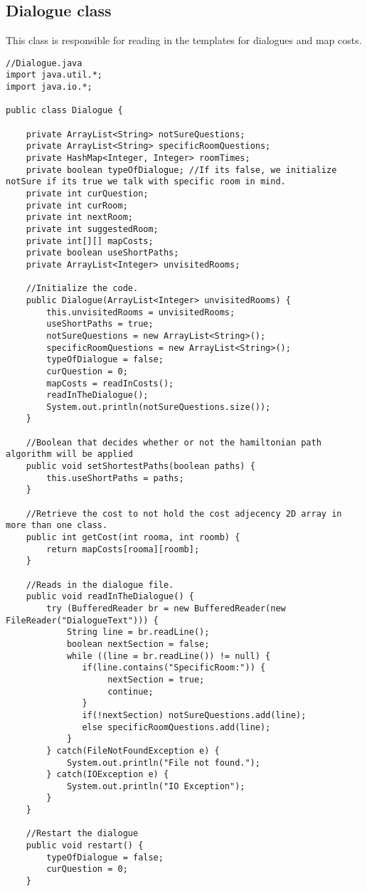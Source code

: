 \subsection{Dialogue class}
This class is responsible for reading in the templates for dialogues and map costs.
\begin{lstlisting}
//Dialogue.java
import java.util.*;
import java.io.*;

public class Dialogue {
	
	private ArrayList<String> notSureQuestions;
	private ArrayList<String> specificRoomQuestions;
	private HashMap<Integer, Integer> roomTimes;
	private boolean typeOfDialogue; //If its false, we initialize notSure if its true we talk with specific room in mind.
	private int curQuestion;
	private int curRoom;
	private int nextRoom;
	private int suggestedRoom;
	private int[][] mapCosts;
	private boolean useShortPaths;
	private ArrayList<Integer> unvisitedRooms;

	//Initialize the code.
	public Dialogue(ArrayList<Integer> unvisitedRooms) {
		this.unvisitedRooms = unvisitedRooms;
		useShortPaths = true;
		notSureQuestions = new ArrayList<String>();
		specificRoomQuestions = new ArrayList<String>();
		typeOfDialogue = false;
		curQuestion = 0;
		mapCosts = readInCosts();
		readInTheDialogue();
		System.out.println(notSureQuestions.size());
	}

	//Boolean that decides whether or not the hamiltonian path algorithm will be applied
	public void setShortestPaths(boolean paths) {
		this.useShortPaths = paths;
	}

	//Retrieve the cost to not hold the cost adjecency 2D array in more than one class.
	public int getCost(int rooma, int roomb) {
		return mapCosts[rooma][roomb];
	}

	//Reads in the dialogue file.
	public void readInTheDialogue() {
		try (BufferedReader br = new BufferedReader(new FileReader("DialogueText"))) {
		    String line = br.readLine();
		    boolean nextSection = false;
		    while ((line = br.readLine()) != null) {
		       if(line.contains("SpecificRoom:")) {
		       		nextSection = true;
		       		continue;
		       }
		       if(!nextSection) notSureQuestions.add(line);
		       else specificRoomQuestions.add(line);
		    }
		} catch(FileNotFoundException e) {
			System.out.println("File not found.");
		} catch(IOException e) {
			System.out.println("IO Exception");
		}
	}

	//Restart the dialogue
	public void restart() {
		typeOfDialogue = false;
		curQuestion = 0;
	}


\end{lstlisting}
